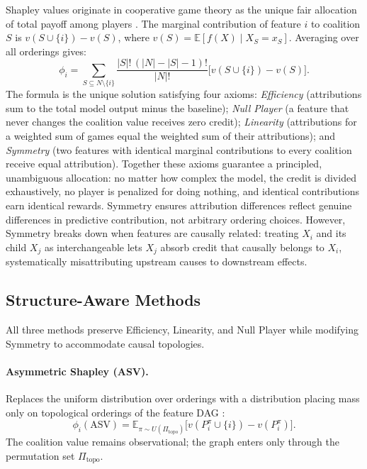 \documentclass[12pt,letterpaper,twocolumn]{article}
\begin{document}
Shapley values originate in cooperative game theory as the unique fair allocation of
total payoff among players \citep{Shapley1953}. The marginal contribution of feature $i$
to coalition $S$ is $v(S \cup \{i\}) - v(S)$, where $v(S) = \mathbb{E}[f(X) \mid X_S =
x_S]$. Averaging over all orderings gives:
\begin{equation}
  \phi_i = \!\sum_{S \subseteq N \setminus \{i\}} \frac{|S|!\,(|N|-|S|-1)!}{|N|!}
  \bigl[ v(S \cup \{i\}) - v(S) \bigr].
\end{equation}
The formula is the unique solution satisfying four axioms: \textit{Efficiency}
(attributions sum to the total model output minus the baseline); \textit{Null Player}
(a feature that never changes the coalition value receives zero credit); \textit{Linearity}
(attributions for a weighted sum of games equal the weighted sum of their attributions);
and \textit{Symmetry} (two features with identical marginal contributions to every
coalition receive equal attribution). Together these axioms guarantee a principled,
unambiguous allocation: no matter how complex the model, the credit is divided exhaustively,
no player is penalized for doing nothing, and identical contributions earn identical
rewards. Symmetry ensures attribution differences reflect genuine differences in predictive
contribution, not arbitrary ordering choices. However, Symmetry breaks down when features
are causally related: treating $X_i$ and its child $X_j$ as interchangeable lets $X_j$
absorb credit that causally belongs to $X_i$, systematically misattributing upstream
causes to downstream effects.

\subsection{Structure-Aware Methods}

All three methods preserve Efficiency, Linearity, and Null Player while modifying
Symmetry to accommodate causal topologies.

\paragraph{Asymmetric Shapley (ASV).} Replaces the uniform distribution over orderings
with a distribution placing mass only on topological orderings of the feature DAG
\citep{Frye2021}:
\begin{equation}
  \phi_i(\mathrm{ASV}) = \mathbb{E}_{\pi \sim U(\Pi_{\mathrm{topo}})}
  \bigl[ v(P_i^\pi \cup \{i\}) - v(P_i^\pi) \bigr].
\end{equation}
The coalition value remains observational; the graph enters only through the permutation
set $\Pi_{\mathrm{topo}}$.
\end{document}
